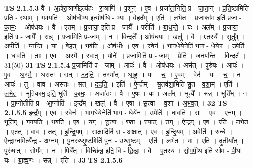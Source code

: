 \documentclass[17pt]{extarticle}
\begin{document}
                  \newline
                                \textbf{ TS 2.1.5.3} \newline
                  वै । अ॒हो॒रा॒त्राणीइत्य॑हः - रा॒त्राणि॑ । प॒शून् । ए॒व । प्रजा॑ता॒निति॒ प्र - जा॒ता॒न् । प्र॒ति॒ष्ठामिति॑ प्रति - स्थाम् । ग॒म॒य॒ति॒ । ओष॑धीभ्य॒ इत्योष॑धि - भ्यः॒ । वे॒हत᳚म् । एति॑ । ल॒भे॒त॒ । प्र॒जाका॑म॒ इति॑ प्र॒जा - का॒मः॒ । ओष॑धयः । वै । ए॒तम् । प्र॒जाया॒ इति॑ प्र - जायै᳚ । परीति॑ । बा॒ध॒न्ते॒ । यः । अल᳚म् । प्र॒जाया॒ इति॑ प्र - जायै᳚ । सन्न् । प्र॒जामिति॑ प्र-जाम् । न । वि॒न्दते᳚ । ओष॑धयः । खलु॑ । वै । ए॒तस्यै᳚ । सूतु᳚म् । अपीति॑ । घ्न॒न्ति॒ । या । वे॒हत् । भव॑ति । ओष॑धीः । ए॒व । स्वेन॑ । भा॒ग॒धेये॒नेति॑ भाग - धेये॑न । उपेति॑ । धा॒व॒ति॒ । ताः । ए॒व । अ॒स्मै॒ । स्वात् । योनेः᳚ । प्र॒जामिति॑ प्र - जाम् । प्रेति॑ । ज॒न॒य॒न्ति॒ । वि॒न्दते᳚ । 31(50) \textbf{  31} \newline
                  \newline
                                \textbf{ TS 2.1.5.4} \newline
                  प्र॒जामिति॑ प्र - जाम् । आपः॑ । वै । ओष॑धयः । अस॑त् । पुरु॑षः । आपः॑ । ए॒व । अ॒स्मै॒ । अस॑तः । सत् । द॒द॒ति॒ । तस्मा᳚त् । आ॒हुः॒ । यः । च॒ । ए॒वम् । वेद॑ । यः । च॒ । न । आपः॑ । तु । वाव । अस॑तः । सत् । द॒द॒ति॒ । इति॑ । ऐ॒न्द्रीम् । सू॒तव॑शा॒मिति॑ सू॒त - व॒शा॒म् । एति॑ । ल॒भे॒त॒ । भूति॑काम॒ इति॒ भूति॑ - का॒मः॒ । अजा॑तः । वै । ए॒षः । यः । अल᳚म् । भूत्यै᳚ । सन्न् । भूति᳚म् । न । प्रा॒प्नोतीति॑ प्र - आ॒प्नोति॑ । इन्द्र᳚म् । खलु॑ । वै । ए॒षा । सू॒त्वा । व॒शा । अ॒भ॒व॒त् । \textbf{  32} \newline
                  \newline
                                \textbf{ TS 2.1.5.5} \newline
                  इन्द्र᳚म् । ए॒व । स्वेन॑ । भा॒ग॒धेये॒नेति॑ भाग - धेये॑न । उपेति॑ । धा॒व॒ति॒ । सः । ए॒व । ए॒न॒म् । भूति᳚म् । ग॒म॒य॒ति॒ । भव॑ति । ए॒व । यम् । सू॒त्वा । व॒शा । स्यात् । तम् । ऐ॒न्द्रम् । ए॒व । एति॑ । ल॒भे॒त॒ । ए॒तत् । वाव । तत् । इ॒न्द्रि॒यम् । सा॒क्षादिति॑ स - अ॒क्षात् । ए॒व । इ॒न्द्रि॒यम् । अवेति॑ । रु॒न्धे॒ । ऐ॒न्द्रा॒ग्नमित्यै᳚न्द्र - अ॒ग्नम् । पु॒न॒रु॒थ्सृ॒ष्टमिति॑ पुनः - उ॒थ्सृ॒ष्टम् । एति॑ । ल॒भे॒त॒ । यः । एति॑ । तृ॒तीया᳚त् । पुरु॑षात् । सोम᳚म् । न । पिबे᳚त् । विच्छि॑न्न॒ इति॒ वि - छि॒न्नः॒ । वै । ए॒तस्य॑ । सो॒म॒पी॒थ इति॑ सोम - पी॒थः । यः । ब्रा॒ह्म॒णः । सन्न् । एति॑ । \textbf{  33} \newline
                  \newline
                                \textbf{ TS 2.1.5.6} \newline
\end{document}
